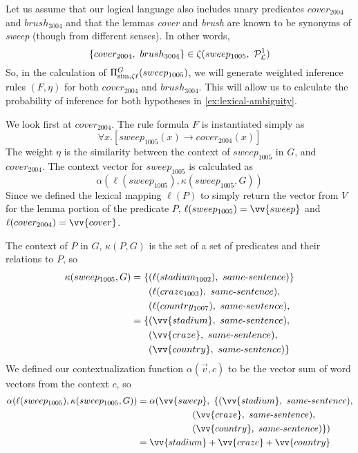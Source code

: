 Let us assume that our logical language \loglang also includes unary predicates
$cover_{2004}$ and $brush_{3004}$ and that the lemmas {\it cover} and {\it
brush} are known to be synonyms of {\it sweep} (though from different senses). 
In other words, \[ \{ cover_{2004},~ brush_{3004} \} \in \zeta(sweep_{1005},~
{\cal{P}}_{{\cal{L}}}^1) \] So, in the calculation of $\Pi^G_{\mathrm{sim},\zeta
\ell}(sweep_{1005})$, we will generate weighted inference rules $(F,\eta)$ for
both $cover_{2004}$ and $brush_{3004}$.  This will allow us to calculate the
probability of inference for both hypotheses in \eqref{ex:lexical-ambiguity}.

We look first at $cover_{2004}$.  The rule formula $F$ is instantiated simply as
\[ \forall x.[sweep_{1005}(x) \to cover_{2004}(x)] \]  The weight $\eta$ is the
similarity between the context of $sweep_{1005}$ in $G$, and $cover_{2004}$.
The context vector for $sweep_{1005}$ is calculated as \[
\alpha(\ell(sweep_{1005}), \kappa(sweep_{1005}, G)) \]  Since we defined the
lexical mapping $\ell(P)$ to simply return the vector from $V$ for the lemma
portion of the predicate $P$, $\ell(sweep_{1005}) = \vv{sweep}$ and
$\ell(cover_{2004}) = \vv{cover}$.  

The context of $P$ in $G$, $\kappa(P,G)$ is the set of a set of
predicates and their relations to $P$, so
\begin{align*}
\kappa(sweep_{1005}, G) 
= \{ & (\ell(\pred{stadium}{1002}),~same\text{-}sentence) \} \\
     & (\ell(\pred{craze}{1003}),~same\text{-}sentence), \\ 
     & (\ell(\pred{country}{1007}),~same\text{-}sentence), \\ 
= \{ & (\vv{stadium},~same\text{-}sentence), \\
     & (\vv{craze},~same\text{-}sentence), \\
     & (\vv{country},~same\text{-}sentence) \}
\end{align*}
We defined our contextualization function $\alpha(\vec v, c)$ to be the vector
sum of word vectors from the context $c$, so
\begin{align*}
\alpha(\ell(sweep_{1005}), \kappa(sweep_{1005}, G))
& = \alpha(\vv{sweep},~ \{ 
                (\vv{stadium},~same\text{-}sentence), \\
& \hspace{60px} (\vv{craze},~same\text{-}sentence), \\
& \hspace{60px} (\vv{country},~same\text{-}sentence) \}) \\
& = \vv{stadium} + \vv{craze} + \vv{country}
\end{align*}

